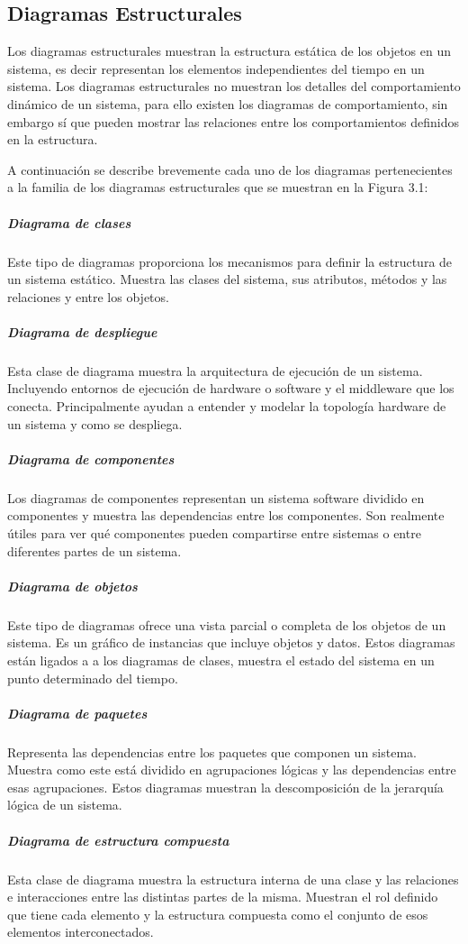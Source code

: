 \documentclass[a4paper, 12pt]{book}
\begin{document}
\subsection{Diagramas Estructurales}
Los diagramas estructurales muestran la estructura estática de los objetos en un sistema, es decir representan los elementos independientes del tiempo en un sistema. Los diagramas estructurales no muestran los detalles del comportamiento dinámico de un sistema, para ello existen los diagramas de comportamiento, sin embargo sí que pueden mostrar las relaciones entre los comportamientos definidos en la estructura.  

A continuación se describe brevemente cada uno de los diagramas pertenecientes a la familia de los diagramas estructurales que se muestran en la Figura 3.1: 

\subparagraph{Diagrama de clases}
Este tipo de diagramas proporciona los mecanismos para definir la estructura de un sistema estático. Muestra las clases del sistema, sus atributos, métodos y las relaciones y entre los objetos. 
\subparagraph{Diagrama de despliegue}
Esta clase de diagrama muestra la arquitectura de ejecución de un sistema. Incluyendo entornos de ejecución de hardware o software y el middleware que los conecta. Principalmente ayudan a entender y modelar la topología hardware de un sistema y como se despliega. 
\subparagraph{Diagrama de componentes} Los diagramas de componentes representan un sistema software dividido en componentes y muestra las dependencias entre los componentes. Son realmente útiles para ver qué componentes pueden compartirse entre sistemas o entre diferentes partes de un sistema.  
\subparagraph{Diagrama de objetos}
Este tipo de diagramas ofrece una vista parcial o completa de los objetos de un sistema. Es un gráfico de instancias que incluye objetos y datos. Estos diagramas están ligados a a los diagramas de clases, muestra el estado del sistema en un punto determinado del tiempo. 
\subparagraph{Diagrama de paquetes}
Representa las dependencias entre los paquetes que componen un sistema. Muestra como este está dividido en agrupaciones lógicas y las dependencias entre esas agrupaciones. Estos diagramas muestran la descomposición de la jerarquía lógica de un sistema.  
\subparagraph{Diagrama de estructura compuesta}
Esta clase de diagrama muestra la estructura interna de una clase y las relaciones e interacciones entre las distintas partes de la misma. Muestran el rol definido que tiene cada elemento y la estructura compuesta como el conjunto de esos elementos interconectados.
\end{document}
